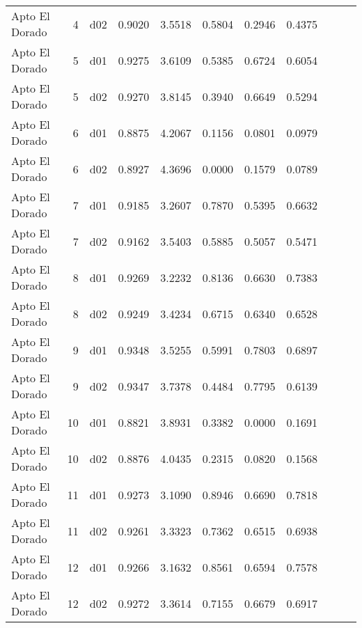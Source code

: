\begin{landscape}
\begin{longtable}{p{2cm}rrrrrrrrrr}
          Apto El Dorado  &          4 &     d02 &   0.9020 &  3.5518 &        0.5804 &           0.2946 &  0.4375 \\
          Apto El Dorado  &          5 &     d01 &   0.9275 &  3.6109 &        0.5385 &           0.6724 &  0.6054 \\
          Apto El Dorado  &          5 &     d02 &   0.9270 &  3.8145 &        0.3940 &           0.6649 &  0.5294 \\
          Apto El Dorado  &          6 &     d01 &   0.8875 &  4.2067 &        0.1156 &           0.0801 &  0.0979 \\
          Apto El Dorado  &          6 &     d02 &   0.8927 &  4.3696 &        0.0000 &           0.1579 &  0.0789 \\
          Apto El Dorado  &          7 &     d01 &   0.9185 &  3.2607 &        0.7870 &           0.5395 &  0.6632 \\
          Apto El Dorado  &          7 &     d02 &   0.9162 &  3.5403 &        0.5885 &           0.5057 &  0.5471 \\
          Apto El Dorado  &          8 &     d01 &   0.9269 &  3.2232 &        0.8136 &           0.6630 &  0.7383 \\
          Apto El Dorado  &          8 &     d02 &   0.9249 &  3.4234 &        0.6715 &           0.6340 &  0.6528 \\
          Apto El Dorado  &          9 &     d01 &   0.9348 &  3.5255 &        0.5991 &           0.7803 &  0.6897 \\
          Apto El Dorado  &          9 &     d02 &   0.9347 &  3.7378 &        0.4484 &           0.7795 &  0.6139 \\
          Apto El Dorado  &         10 &     d01 &   0.8821 &  3.8931 &        0.3382 &           0.0000 &  0.1691 \\
          Apto El Dorado  &         10 &     d02 &   0.8876 &  4.0435 &        0.2315 &           0.0820 &  0.1568 \\
          Apto El Dorado  &         11 &     d01 &   0.9273 &  3.1090 &        0.8946 &           0.6690 &  0.7818 \\
          Apto El Dorado  &         11 &     d02 &   0.9261 &  3.3323 &        0.7362 &           0.6515 &  0.6938 \\
          Apto El Dorado  &         12 &     d01 &   0.9266 &  3.1632 &        0.8561 &           0.6594 &  0.7578 \\
          Apto El Dorado  &         12 &     d02 &   0.9272 &  3.3614 &        0.7155 &           0.6679 &  0.6917 \\

\end{longtable}
\end{landscape}
